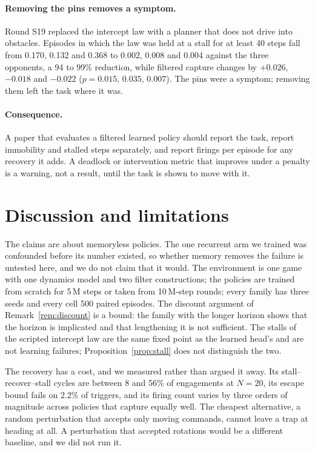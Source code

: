 \documentclass{l4dc2027}
\begin{document}
\paragraph{Removing the pins removes a symptom.} Round S19 replaced the intercept law with a planner that does not drive into obstacles. Episodes in which the law was held at a stall for at least 40 steps fall from 0.170, 0.132 and 0.368 to 0.002, 0.008 and 0.004 against the three opponents, a 94 to 99\% reduction, while filtered capture changes by $+0.026$, $-0.018$ and $-0.022$ ($p = 0.015$, $0.035$, $0.007$). The pins were a symptom; removing them left the task where it was.

\paragraph{Consequence.} A paper that evaluates a filtered learned policy should report the task, report immobility and stalled steps separately, and report firings per episode for any recovery it adds. A deadlock or intervention metric that improves under a penalty is a warning, not a result, until the task is shown to move with it.

\section{Discussion and limitations}\label{sec:discussion}

The claims are about memoryless policies. The one recurrent arm we trained was confounded before its number existed, so whether memory removes the failure is untested here, and we do not claim that it would. The environment is one game with one dynamics model and two filter constructions; the policies are trained from scratch for 5\,M steps or taken from 10\,M-step rounds; every family has three seeds and every cell 500 paired episodes. The discount argument of Remark~\ref{rem:discount} is a bound: the family with the longer horizon shows that the horizon is implicated and that lengthening it is not sufficient. The stalls of the scripted intercept law are the same fixed point as the learned head's and are not learning failures; Proposition~\ref{prop:stall} does not distinguish the two.

The recovery has a cost, and we measured rather than argued it away. Its stall--recover--stall cycles are between 8 and 56\% of engagements at $N = 20$, its escape bound fails on 2.2\% of triggers, and its firing count varies by three orders of magnitude across policies that capture equally well. The cheapest alternative, a random perturbation that accepts only moving commands, cannot leave a trap at heading at all. A perturbation that accepted rotations would be a different baseline, and we did not run it.
\end{document}
